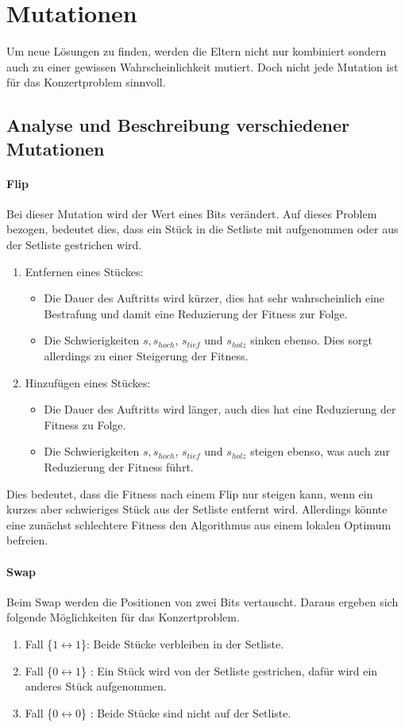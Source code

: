 \section{Mutationen}\label{sec:mutation}
Um neue Lösungen zu finden, werden die Eltern nicht nur kombiniert sondern auch zu
einer gewissen Wahrscheinlichkeit mutiert. Doch nicht jede Mutation ist für das Konzertproblem 
sinnvoll. 
\subsection{Analyse und Beschreibung verschiedener Mutationen}
\paragraph{Flip}
Bei dieser Mutation wird der Wert eines Bits verändert. Auf dieses Problem bezogen, 
bedeutet dies, dass ein Stück in die Setliste mit aufgenommen oder aus 
der Setliste gestrichen wird. 
\begin{enumerate}
    \item Entfernen eines Stückes: 
    \begin{itemize}
        \item Die Dauer des Auftritts wird kürzer, dies hat sehr wahrscheinlich eine Bestrafung und 
            damit eine Reduzierung der Fitness zur Folge. 
        \item Die Schwierigkeiten $s, s_{hoch}$, $ s_{tief}$ und $s_{holz}$ sinken ebenso. Dies sorgt allerdings 
            zu einer Steigerung der Fitness. 
    \end{itemize}
    \item Hinzufügen eines Stückes:
    \begin{itemize}
        \item Die Dauer des Auftritts wird länger, auch dies hat eine Reduzierung der Fitness zu Folge.
        \item Die Schwierigkeiten $s, s_{hoch}$, $ s_{tief}$ und $s_{holz}$ steigen ebenso, was auch zur Reduzierung 
            der Fitness führt. 
    \end{itemize}
\end{enumerate}
Dies bedeutet, dass die Fitness nach einem Flip nur steigen kann, wenn ein kurzes aber schwieriges Stück aus 
der Setliste entfernt wird. Allerdings könnte eine zunächst schlechtere Fitness den Algorithmus aus 
einem lokalen Optimum befreien.

\paragraph{Swap}
Beim Swap werden die Positionen von zwei Bits vertauscht. 
Daraus ergeben sich folgende Möglichkeiten für das Konzertproblem. 
\begin{enumerate}
    \item Fall \{$1 \longleftrightarrow 1$\}: Beide Stücke verbleiben in der Setliste.
    \item Fall \{$0 \longleftrightarrow 1$\} : Ein Stück wird von der Setliste gestrichen, dafür wird ein anderes Stück aufgenommen.
    \item Fall \{$0 \longleftrightarrow 0$\} : Beide Stücke sind nicht auf der Setliste.
\end{enumerate}

